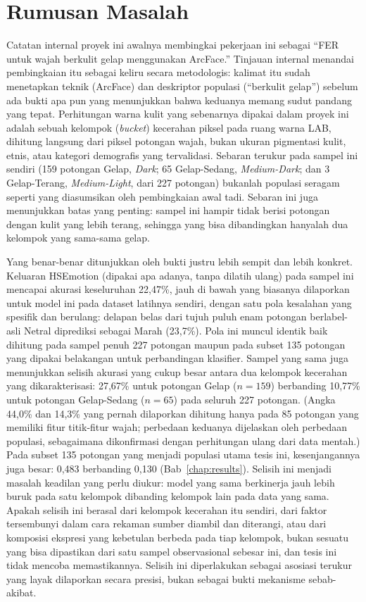 \section{Rumusan Masalah}
\label{sec:problem}

Catatan internal proyek ini awalnya membingkai pekerjaan ini sebagai ``FER untuk wajah berkulit gelap menggunakan ArcFace.'' Tinjauan internal menandai pembingkaian itu sebagai keliru secara metodologis: kalimat itu sudah menetapkan teknik (ArcFace) dan deskriptor populasi (``berkulit gelap'') sebelum ada bukti apa pun yang menunjukkan bahwa keduanya memang sudut pandang yang tepat. Perhitungan warna kulit yang sebenarnya dipakai dalam proyek ini adalah sebuah kelompok (\textit{bucket}) kecerahan piksel pada ruang warna LAB\label{abbr:LAB}, dihitung langsung dari piksel potongan wajah, bukan ukuran pigmentasi kulit, etnis, atau kategori demografis yang tervalidasi. Sebaran terukur pada sampel ini sendiri (159 potongan Gelap, \textit{Dark}; 65 Gelap-Sedang, \textit{Medium-Dark}; dan 3 Gelap-Terang, \textit{Medium-Light}, dari 227 potongan) bukanlah populasi seragam seperti yang diasumsikan oleh pembingkaian awal tadi. Sebaran ini juga menunjukkan batas yang penting: sampel ini hampir tidak berisi potongan dengan kulit yang lebih terang, sehingga yang bisa dibandingkan hanyalah dua kelompok yang sama-sama gelap.

Yang benar-benar ditunjukkan oleh bukti justru lebih sempit dan lebih konkret. Keluaran HSEmotion (dipakai apa adanya, tanpa dilatih ulang) pada sampel ini mencapai akurasi keseluruhan 22,47\%, jauh di bawah yang biasanya dilaporkan untuk model ini pada dataset latihnya sendiri, dengan satu pola kesalahan yang spesifik dan berulang: delapan belas dari tujuh puluh enam potongan berlabel-asli Netral diprediksi sebagai Marah (23,7\%). Pola ini muncul identik baik dihitung pada sampel penuh 227 potongan maupun pada subset 135 potongan yang dipakai belakangan untuk perbandingan klasifier. Sampel yang sama juga menunjukkan selisih akurasi yang cukup besar antara dua kelompok kecerahan yang dikarakterisasi: 27,67\% untuk potongan Gelap ($n = 159$) berbanding 10,77\% untuk potongan Gelap-Sedang ($n = 65$) pada seluruh 227 potongan. (Angka 44,0\% dan 14,3\% yang pernah dilaporkan dihitung hanya pada 85 potongan yang memiliki fitur titik-fitur wajah; perbedaan keduanya dijelaskan oleh perbedaan populasi, sebagaimana dikonfirmasi dengan perhitungan ulang dari data mentah.) Pada subset 135 potongan yang menjadi populasi utama tesis ini, kesenjangannya juga besar: 0,483 berbanding 0,130 (Bab~\ref{chap:results}). Selisih ini menjadi masalah keadilan yang perlu diukur: model yang sama berkinerja jauh lebih buruk pada satu kelompok dibanding kelompok lain pada data yang sama. Apakah selisih ini berasal dari kelompok kecerahan itu sendiri, dari faktor tersembunyi dalam cara rekaman sumber diambil dan diterangi, atau dari komposisi ekspresi yang kebetulan berbeda pada tiap kelompok, bukan sesuatu yang bisa dipastikan dari satu sampel observasional sebesar ini, dan tesis ini tidak mencoba memastikannya. Selisih ini diperlakukan sebagai asosiasi terukur yang layak dilaporkan secara presisi, bukan sebagai bukti mekanisme sebab-akibat.

